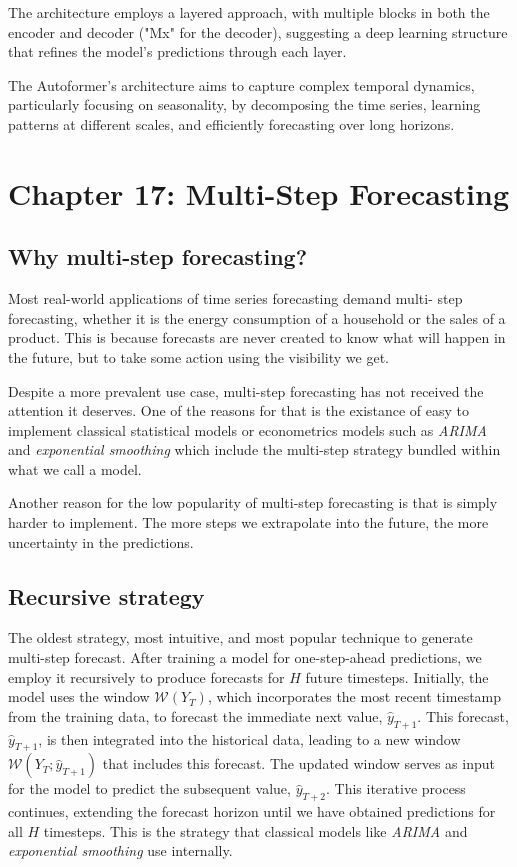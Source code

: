 \documentclass{article}
\begin{document}
The architecture employs a layered approach, with multiple blocks in both the encoder and decoder ("Mx" for the decoder), suggesting a deep learning structure that refines the model's predictions through each layer.

The Autoformer's architecture aims to capture complex temporal dynamics, particularly focusing on seasonality, by decomposing the time series, learning patterns at different scales, and efficiently forecasting over long horizons.

\section{Chapter 17: Multi-Step Forecasting}

\subsection{Why multi-step forecasting?}
Most real-world applications of time series forecasting demand multi-
step forecasting, whether it is the energy consumption of a household or the sales of a product. This
is because forecasts are never created to know what will happen in the future, but to take some action
using the visibility we get.

Despite a more prevalent use case, multi-step forecasting has not received the attention it deserves.
One of the reasons for that is the existance of easy to implement classical statistical models or econometrics models 
such as \textit{ARIMA} and \textit{exponential smoothing} which include the multi-step strategy bundled within what we call a model. 

Another reason for the low popularity of multi-step forecasting is that is simply harder to implement. The more steps we extrapolate into the 
future, the more uncertainty in the predictions.

\subsection{Recursive strategy}
The oldest strategy, most intuitive, and most popular technique to generate multi-step forecast. 
After training a model for one-step-ahead predictions, we employ it recursively to produce forecasts for $H$ future timesteps. 
Initially, the model uses the window $\mathcal{W}(Y_T)$, which incorporates the most recent timestamp from the training data, 
to forecast the immediate next value, $\hat{y}_{T+1}$. This forecast, $\hat{y}_{T+1}$, is then integrated into the historical data, 
leading to a new window $\mathcal{W}(Y_T; \hat{y}_{T+1})$ that includes this forecast. 
The updated window serves as input for the model to predict the subsequent value, $\hat{y}_{T+2}$. 
This iterative process continues, extending the forecast horizon until we have obtained predictions for all $H$ timesteps.
This is the strategy that classical models like \textit{ARIMA} and \textit{exponential smoothing} use internally. 
\end{document}
